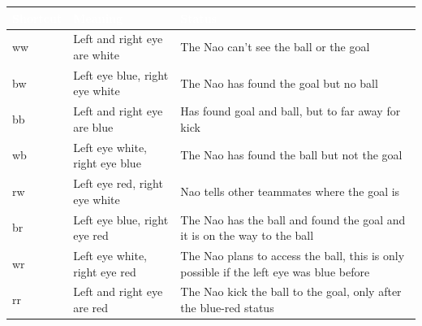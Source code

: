 \documentclass[12pt]{article}
\theoremstyle{definition}
\begin{document}
\begin{tabular}{|p{.21\linewidth}|p{.3\linewidth}|p{.38\linewidth}|}
\hline
\cellcolor[gray]{0.5}\textcolor{white}{Shortcut} & \cellcolor[gray]{0.45}\textcolor{white}{Meaning} & \cellcolor[gray]{0.5}\textcolor{white}{Status}\\ \hline
ww&Left and right eye are white&The Nao can't see the ball or the goal\\ \hline
bw&Left eye blue, right eye white&The Nao has found the goal but no ball \\ \hline
bb&Left and right eye are blue&Has found goal and ball, but to far away for kick \\ \hline
wb&Left eye white, right eye blue&The Nao has found the ball but not the goal\\ \hline 
rw&Left eye red, right eye white&Nao tells other teammates where the goal is \\ \hline
br&Left eye blue, right eye red&The Nao has the ball and found the goal and it is on the way to the ball\\ \hline
wr&Left eye white, right eye red&The Nao plans to access the ball, this is only possible if the left eye was blue before\\ \hline
rr&Left and right eye are red&The Nao kick the ball to the goal, only after the blue-red status\\ \hline
\end{tabular}

{}
\end{document}
